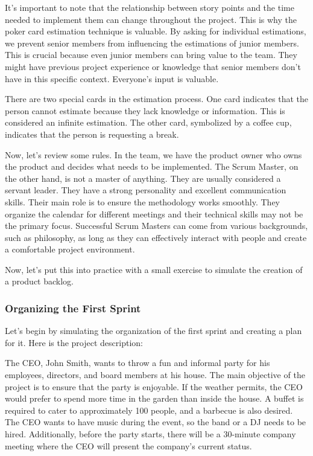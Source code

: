 It's important to note that the relationship between story points and
the time needed to implement them can change throughout the project.
This is why the poker card estimation technique is valuable. By asking
for individual estimations, we prevent senior members from influencing
the estimations of junior members. This is crucial because even junior
members can bring value to the team. They might have previous project
experience or knowledge that senior members don't have in this specific
context. Everyone's input is valuable.

There are two special cards in the estimation process. One card
indicates that the person cannot estimate because they lack knowledge or
information. This is considered an infinite estimation. The other card,
symbolized by a coffee cup, indicates that the person is requesting a
break.

Now, let's review some rules. In the team, we have the product owner who
owns the product and decides what needs to be implemented. The Scrum
Master, on the other hand, is not a master of anything. They are usually
considered a servant leader. They have a strong personality and
excellent communication skills. Their main role is to ensure the
methodology works smoothly. They organize the calendar for different
meetings and their technical skills may not be the primary focus.
Successful Scrum Masters can come from various backgrounds, such as
philosophy, as long as they can effectively interact with people and
create a comfortable project environment.

Now, let's put this into practice with a small exercise to simulate the
creation of a product backlog.

\subsubsection{Organizing the First Sprint}

Let's begin by simulating the organization of the first sprint and
creating a plan for it. Here is the project description:

The CEO, John Smith, wants to throw a fun and informal party for his
employees, directors, and board members at his house. The main objective
of the project is to ensure that the party is enjoyable. If the weather
permits, the CEO would prefer to spend more time in the garden than
inside the house. A buffet is required to cater to approximately 100
people, and a barbecue is also desired. The CEO wants to have music
during the event, so the band or a DJ needs to be hired. Additionally,
before the party starts, there will be a 30-minute company meeting where
the CEO will present the company's current status.

